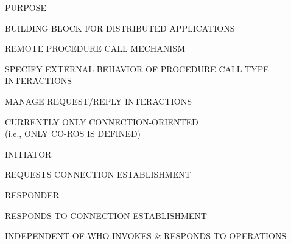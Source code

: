

\begin{bwslide}

\begin{nrtc}
\item	PURPOSE
	\begin{nrtc}
	\item	BUILDING BLOCK FOR DISTRIBUTED APPLICATIONS
	\item	REMOTE PROCEDURE CALL MECHANISM
	\item	SPECIFY EXTERNAL BEHAVIOR OF PROCEDURE CALL TYPE INTERACTIONS
	\item	MANAGE REQUEST/REPLY INTERACTIONS
	\end{nrtc}
\item   CURRENTLY ONLY CONNECTION-ORIENTED\\
        (i.e., ONLY CO-ROS IS DEFINED)
\end{nrtc}
\end{bwslide}


\begin{bwslide}

\begin{nrtc}
\item	INITIATOR
	\begin{nrtc}
	\item	REQUESTS CONNECTION ESTABLISHMENT
	\end{nrtc}
\item	RESPONDER
	\begin{nrtc}
	\item	RESPONDS TO CONNECTION ESTABLISHMENT
	\end{nrtc}
\item	INDEPENDENT OF WHO INVOKES \& RESPONDS TO OPERATIONS
\end{nrtc}
\end{bwslide}


